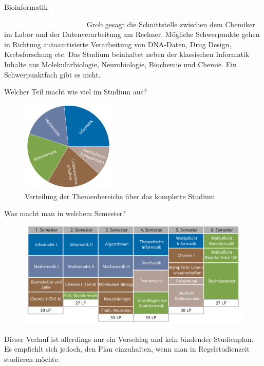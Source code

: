 	\begin{Huge}
				Bioinformatik
			\end{Huge}
			\begin{exampleblock}{\textcolor{white}{Was ist der Studiengang?}}
				Grob gesagt die Schnittstelle zwischen dem Chemiker im Labor und der Datenverarbeitung am Rechner. Mögliche Schwerpunkte gehen in Richtung autoamtisierte Verarbeitung von DNA-Daten, Drug Design, Krebsforschung etc.
				Das Studium beinhaltet neben der klassischen Informatik Inhalte aus Molekularbiologie, Neurobiologie, Biochemie und Chemie. Ein Schwerpunktfach gibt es nicht.
			\end{exampleblock}
		
			\begin{block}{Welcher Teil macht wie viel im Studium aus?}
				\begin{figure}[h!]
						\includegraphics[width=0.4\textwidth]{charts/bioinformatik-Piechart.pdf}
					\caption{Verteilung der Themenbereiche über das komplette Studium}
				\end{figure}
			\end{block}
		
		\begin{block}{Was macht man in welchem Semester?}
			\begin{figure}[h!]
					\includegraphics[width=\textwidth]{charts/bioinformatik-Studienplan_abWS18.pdf}
			\end{figure}
		Dieser Verlauf ist allerdings nur ein Vorschlag und kein bindender Studienplan. Es empfiehlt sich jedoch, den Plan einzuhalten, wenn man in Regelstudienzeit studieren möchte.
		\end{block}